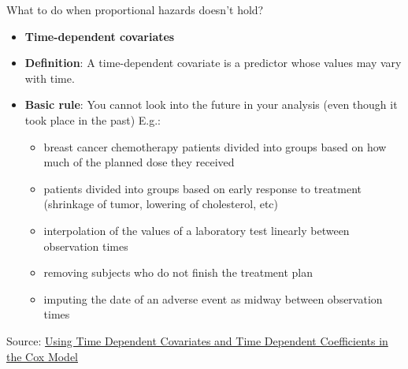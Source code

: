 \documentclass[
  ignorenonframetext,
]{beamer}
\providecommand{\tightlist}{%
  \setlength{\itemsep}{0pt}\setlength{\parskip}{0pt}}
\begin{document}
\begin{frame}{What to do when proportional hazards doesn't hold?}
\protect\hypertarget{what-to-do-when-proportional-hazards-doesnt-hold}{}

\begin{itemize}
\tightlist
\item
  \textbf{Time-dependent covariates}
\item
  \textbf{Definition}: A time-dependent covariate is a predictor whose
  values may vary with time.
\item
  \textbf{Basic rule}: You cannot look into the future in your analysis
  (even though it took place in the past) E.g.:

  \begin{itemize}
  \tightlist
  \item
    breast cancer chemotherapy patients divided into groups based on how
    much of the planned dose they received
  \item
    patients divided into groups based on early response to treatment
    (shrinkage of tumor, lowering of cholesterol, etc)
  \item
    interpolation of the values of a laboratory test linearly between
    observation times
  \item
    removing subjects who do not finish the treatment plan
  \item
    imputing the date of an adverse event as midway between observation
    times
  \end{itemize}
\end{itemize}

Source:
\href{https://cran.r-project.org/web/packages/survival/vignettes/timedep.pdf}{Using
Time Dependent Covariates and Time Dependent Coefficients in the Cox
Model}

\end{frame}
\end{document}
